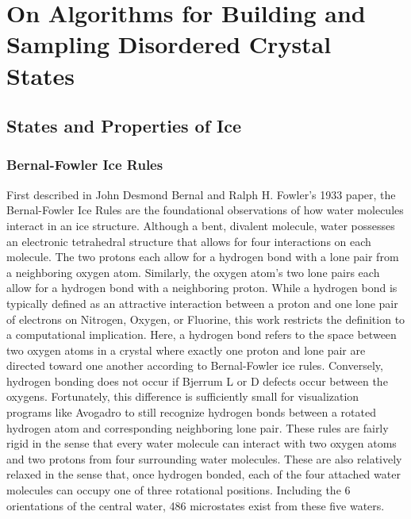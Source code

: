 \chapter{On Algorithms for Building and Sampling Disordered Crystal States}
\label{ch:iceXI}

\section{States and Properties of Ice}


\subsection{Bernal-Fowler Ice Rules}

First described in John Desmond Bernal and Ralph H. Fowler's 1933 paper, the Bernal-Fowler Ice Rules are the foundational observations of how water molecules interact in an ice structure.\cite{BFIceOG}
Although a bent, divalent molecule, water possesses an electronic tetrahedral structure that allows for four interactions on each molecule.
The two protons each allow for a hydrogen bond with a lone pair from a neighboring oxygen atom.
Similarly, the oxygen atom's two lone pairs each allow for a hydrogen bond with a neighboring proton. 
While a hydrogen bond is typically defined as an attractive interaction between a proton and one lone pair of electrons on Nitrogen, Oxygen, or Fluorine, this work restricts the definition to a computational implication.
Here, a hydrogen bond refers to the space between two oxygen atoms in a crystal where exactly one proton and lone pair are directed toward one another according to Bernal-Fowler ice rules. 
Conversely, hydrogen bonding does not occur if Bjerrum L or D defects occur between the oxygens.
Fortunately, this difference is sufficiently small for visualization programs like Avogadro to still recognize hydrogen bonds between a rotated hydrogen atom and corresponding neighboring lone pair. 
These rules are fairly rigid in the sense that every water molecule can interact with two oxygen atoms and two protons from four surrounding water molecules.
These are also relatively relaxed in the sense that, once hydrogen bonded, each of the four attached water molecules can occupy one of three rotational positions. 
Including the 6 orientations of the central water, 486 microstates exist from these five waters.

